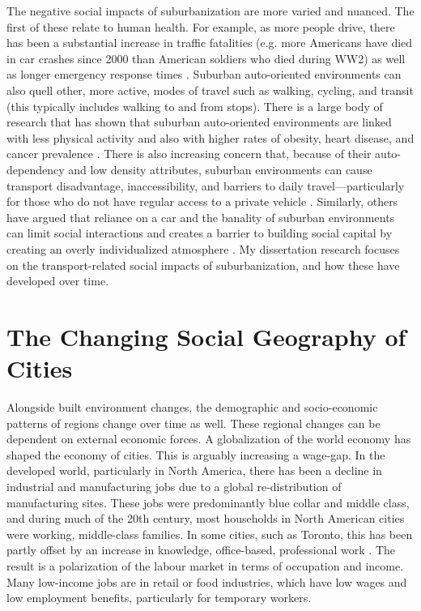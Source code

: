 The negative social impacts of suburbanization are more varied and nuanced. The first of these relate to human health. For example, as more people drive, there has been a substantial increase in traffic fatalities (e.g. more Americans have died in car crashes since 2000 than American soldiers who died during WW2) as well as longer emergency response times \cite{ewing_compactness_2015}. Suburban auto-oriented environments can also quell other, more active, modes of travel such as walking, cycling, and transit (this typically includes walking to and from stops). There is a large body of research that has shown that suburban auto-oriented environments are linked with less physical activity and also with higher rates of obesity, heart disease, and cancer prevalence \cite{ewing_compactness_2015,ewing_relationship_2003}. 
There is also increasing concern that, because of their auto-dependency and low density attributes, suburban environments can cause transport disadvantage, inaccessibility, and barriers to daily travel---particularly for those who do not have regular access to a private vehicle \cite{roorda_trip_2010,lucas_transport_2012,allen_planning_2020}. Similarly, others have argued that reliance on a car and the banality of suburban environments can limit social interactions and creates a barrier to building social capital by creating an overly individualized atmosphere \cite{jacobs_death_1961,kunstler_geography_1994}. My dissertation research focuses on the transport-related social impacts of suburbanization, and how these have developed over time.






\section{The Changing Social Geography of Cities}

Alongside built environment changes, the demographic and socio-economic patterns of regions change over time as well. These regional changes can be dependent on external economic forces. A globalization of the world economy has shaped the economy of cities. This is arguably increasing a wage-gap. In the developed world, particularly in North America, there has been a decline in industrial and manufacturing jobs due to a global re-distribution of manufacturing sites. These jobs were predominantly blue collar and middle class, and during much of the 20th century, most households in North American cities were working, middle-class families. In some cities, such as Toronto, this has been partly offset by an increase in knowledge, office-based, professional work \cite{walks_social_2001}. The result is a polarization of the labour market in terms of occupation and income. Many low-income jobs are in retail or food industries, which have low wages and low employment benefits, particularly for temporary workers. 

